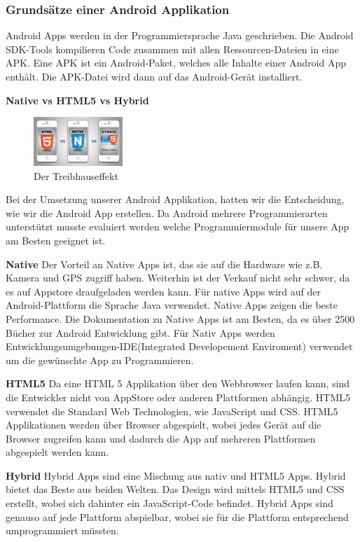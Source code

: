 
\subsubsection{Grundsätze einer Android Applikation}
\label{subsec:aapp-fundam}

Android Apps werden in der Programmiersprache Java geschrieben.
Die Android SDK-Tools kompilieren Code zusammen mit allen Ressourcen-Dateien in eine APK.
Eine APK ist ein Android-Paket, welches alle Inhalte einer Android App enthält. 
Die APK-Datei wird dann auf das Android-Gerät installiert. 


\textbf{Native vs HTML5 vs Hybrid}
\begin{figure}
	\centering
	\includegraphics[width=0.3\textwidth]{images/HTML-vs-Native-vs-Hybrid}
	\caption{Der Treibhauseffekt \cite{Faik.CH2-app-fundam}}
\end{figure}
Bei der Umsetzung unserer Android Applikation, hatten wir die Entscheidung, wie wir die Android App erstellen. 
Da Android mehrere Programmierarten unterstützt musste evaluiert werden welche Programmiermodule für unsere App am Besten geeignet ist. \nextline

\textbf{Native\newline} 
Der Vorteil an Native Apps ist, das sie auf die Hardware wie z.B. Kamera und GPS zugriff haben. 
Weiterhin ist der Verkauf nicht sehr schwer, da es auf Appstore draufgeladen werden kann. 
Für native Apps wird auf der Android-Plattform die Sprache Java verwendet.
Native Apps zeigen die beste Performance.
Die Dokumentation zu Native Apps ist am Besten, da es über 2500 Bücher zur Android Entwicklung gibt.
Für Nativ Apps werden Entwicklungsumgebungen-IDE(Integrated Developement Enviroment) verwendet um die gewünschte App zu Programmieren.\nextline



\textbf{HTML5\newline} 
Da eine HTML 5 Applikation über den Webbrowser laufen kann, sind die Entwickler nicht von AppStore oder anderen Plattformen abhängig. 
HTML5 verwendet die Standard Web Technologien, wie JavaScript und CSS.
HTML5 Applikationen werden über Browser abgespielt, wobei jedes Gerät auf die Browser zugreifen kann und dadurch die App auf mehreren Plattformen abgespielt werden kann. \nextline

\textbf{Hybrid\newline} 
Hybrid Apps sind eine Mischung aus nativ und HTML5 Apps. Hybrid bietet das Beste aus beiden Welten. Das Design wird mittels HTML5 und CSS erstellt, wobei sich dahinter ein JavaScript-Code befindet. Hybrid Apps sind genauso auf jede Plattform abspielbar, wobei sie für die Plattform entsprechend umprogrammiert müssten.    
\nextline

\clearpage %